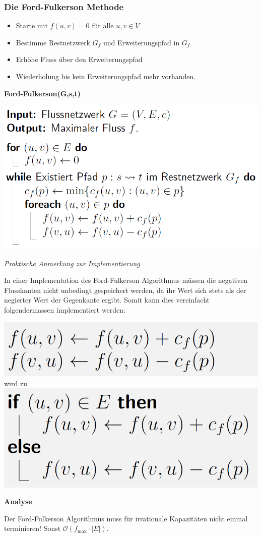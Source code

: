 \begin{sectionbox}
\subsubsection{Die Ford-Fulkerson Methode}\smallskip
\begin{itemize}
    \item Starte mit $f(u, v)=0$ für alle $u, v \in V$
    \item Bestimme Restnetzwerk $G_{f}$ und Erweiterungspfad in $G_{f}$
    \item Erhöhe Fluss über den Erweiterungspfad
    \item Wiederholung bis kein Erweiterungspfad mehr vorhanden.
\end{itemize}\smallskip

\textbf{Ford-Fulkerson(G,s,t)}\par
\includegraphics[width = 0.8\columnwidth]{../img/FoFu.png}\par\smallskip

\textit{Praktische Anmerkung zur Implementierung}\par
In einer Implementation des Ford-Fulkerson Algorithmus müssen die negativen Flusskanten nicht unbedingt gespeichert werden, da ihr Wert sich stets als der negierter Wert der Gegenkante ergibt. Somit kann dies vereinfacht folgendermassen implementiert werden:\par\smallskip
\includegraphics[width = 0.45\columnwidth]{../img/paFF1.png} wird zu
\includegraphics[width = 0.4\columnwidth]{../img/paFF2.png}\par\smallskip

\textbf{Analyse}\par
Der Ford-Fulkerson Algorithmus muss für irrationale Kapazitäten nicht einmal terminieren! Sonst $\mathcal{O}\left(f_{\max }\cdot |E|\right)$.
\end{sectionbox}
